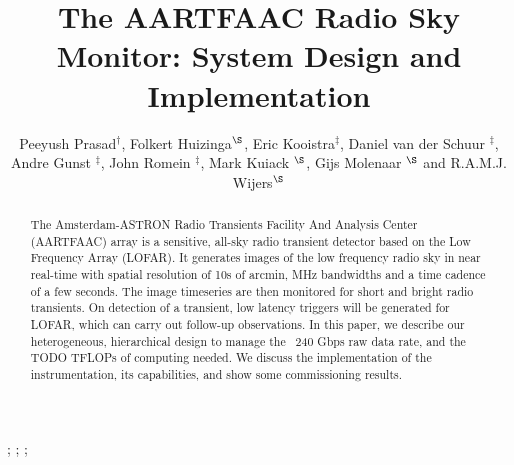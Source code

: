 \documentclass{ws-jai}
\begin{document}
\catchline{}{}{}{}{} %


\title{The AARTFAAC Radio Sky Monitor: System Design and Implementation}

\author{Peeyush Prasad$^\dagger$, Folkert Huizinga$^\S$, Eric Kooistra$^\ddagger$, Daniel van der Schuur $^\ddagger$, Andre Gunst $^\ddagger$, John Romein $^\ddagger$, Mark Kuiack $^\S$, Gijs Molenaar $^\S$ and R.A.M.J. Wijers$^\S$}

\address{
$^\dagger$Anton Pannekoek Institute, University of Amsterdam, Amsterdam, The Netherlands, p.prasad@uva.nl\\
$^\ddagger$ASTRON, Oude Hoogeveensedijk, 7991PD, The Netherlands\\
$^\S$Anton Pannekoek Institute, University of Amsterdam, Amsterdam\\
}

\maketitle


\begin{history}
;
;
;
\end{history}

\begin{abstract}
The Amsterdam-ASTRON  Radio Transients  Facility And Analysis  Center (AARTFAAC)
array  is  a sensitive,  all-sky  radio  transient  detector  based on  the  Low
Frequency Array (LOFAR).  It generates images  of the low frequency radio sky in
near real-time  with spatial resolution of  10s of arcmin, MHz  bandwidths and a
time cadence of a few seconds. The image timeseries are then monitored for short
and bright radio  transients. On detection of a transient,  low latency triggers
will be  generated for LOFAR,  which can  carry out follow-up  observations.  In
this paper,  we describe  our heterogeneous, hierarchical  design to  manage the
~240 Gbps raw data rate, and the TODO TFLOPs of computing needed.  We discuss the
implementation  of   the  instrumentation,  its  capabilities,   and  show  some
commissioning results.
\end{abstract}

\end{document}
